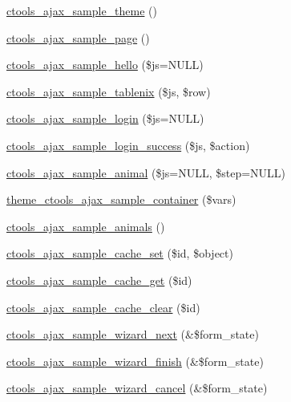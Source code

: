 \begin{DoxyCompactItemize}
\item 
\hyperlink{ctools__ajax__sample_8module_a3b2a2efa6cddf4bdd87af59fe18d9a94}{ctools\_\-ajax\_\-sample\_\-theme} ()
\item 
\hyperlink{ctools__ajax__sample_8module_af08b8a6d50812f6c2504a54643cb371c}{ctools\_\-ajax\_\-sample\_\-page} ()
\item 
\hyperlink{ctools__ajax__sample_8module_a8d252c34000a1e6dd23ec6ced1253923}{ctools\_\-ajax\_\-sample\_\-hello} (\$js=NULL)
\item 
\hyperlink{ctools__ajax__sample_8module_a003fef8156e599759a793be39e6a38a7}{ctools\_\-ajax\_\-sample\_\-tablenix} (\$js, \$row)
\item 
\hyperlink{ctools__ajax__sample_8module_a885e6fa552eb69f6f833dabb49b5da36}{ctools\_\-ajax\_\-sample\_\-login} (\$js=NULL)
\item 
\hyperlink{ctools__ajax__sample_8module_ac432d6572cd61dfbcf94de6322b2a67b}{ctools\_\-ajax\_\-sample\_\-login\_\-success} (\$js, \$action)
\item 
\hyperlink{ctools__ajax__sample_8module_ab5d64413c7e1e190f4db585faaba479f}{ctools\_\-ajax\_\-sample\_\-animal} (\$js=NULL, \$step=NULL)
\item 
\hyperlink{ctools__ajax__sample_8module_a3c08fd36574f336a7ac1c374bf7a8ea5}{theme\_\-ctools\_\-ajax\_\-sample\_\-container} (\$vars)
\item 
\hyperlink{ctools__ajax__sample_8module_a8069492e8d6620eaebe3331105b18c21}{ctools\_\-ajax\_\-sample\_\-animals} ()
\item 
\hyperlink{ctools__ajax__sample_8module_a64200d68fbc8efb5597f69b3d138d165}{ctools\_\-ajax\_\-sample\_\-cache\_\-set} (\$id, \$object)
\item 
\hyperlink{ctools__ajax__sample_8module_add5dc6bf716e16e91dd60a01e37159a7}{ctools\_\-ajax\_\-sample\_\-cache\_\-get} (\$id)
\item 
\hyperlink{ctools__ajax__sample_8module_a3e67af16ed2922d6ed1d25706e8a96bd}{ctools\_\-ajax\_\-sample\_\-cache\_\-clear} (\$id)
\item 
\hyperlink{ctools__ajax__sample_8module_a9a191fc7e9c9ba777975224408dfa8e1}{ctools\_\-ajax\_\-sample\_\-wizard\_\-next} (\&\$form\_\-state)
\item 
\hyperlink{ctools__ajax__sample_8module_a3db3671aee7a865c701ad8b842a6496f}{ctools\_\-ajax\_\-sample\_\-wizard\_\-finish} (\&\$form\_\-state)
\item 
\hyperlink{ctools__ajax__sample_8module_a8d0ff788c352e3f4e52127cde863e014}{ctools\_\-ajax\_\-sample\_\-wizard\_\-cancel} (\&\$form\_\-state)

\end{DoxyCompactItemize}
